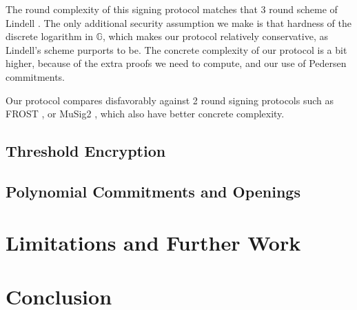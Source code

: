 The round complexity of this signing protocol matches
that 3 round scheme of Lindell \cite{lindell_simple_2022}.
The only additional security assumption we make is that hardness
of the discrete logarithm in $\mathbb{G}$, which makes our protocol
relatively conservative, as Lindell's scheme purports to be.
The concrete complexity of our protocol is a bit higher, because of
the extra proofs we need to compute, and our use of Pedersen commitments.

Our protocol compares disfavorably against 2 round signing protocols
such as FROST \cite{komlo_frost_2020}, or MuSig2 \cite{nick_musig2_2021},
which also have better concrete complexity.

\subsection{Threshold Encryption}

\subsection{Polynomial Commitments and Openings}

\section{Limitations and Further Work}




\section{Conclusion}



\small 

